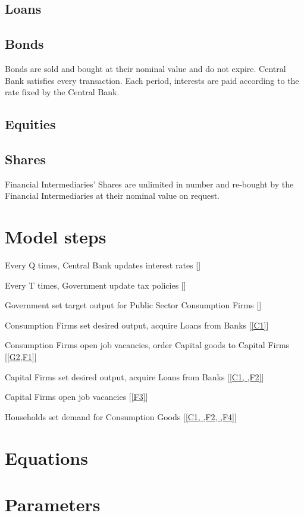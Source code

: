 \documentclass[a4paper, headings=standardclasses]{scrartcl}
\begin{document}
\subsection{Loans}

\subsection{Bonds}
Bonds are sold and bought at their nominal value and do not expire. Central Bank satisfies every transaction. Each period, interests are paid according to the rate fixed by the Central Bank.

\subsection{Equities}

\subsection{Shares}
Financial Intermediaries' Shares are unlimited in number and re-bought by the Financial Intermediaries at their nominal value on request.

\section{Model steps}
\begin{steps}
	\item \label{C1} Every Q times, Central Bank updates interest rates []
	\item \label{G1} Every T times, Government update tax policies []
	\item \label{G2} Government set target output for Public Sector Consumption Firms []
	\item \label{F1} Consumption Firms set desired output, acquire Loans from Banks [\cref{C1}]
	\item \label{F2} Consumption Firms open job vacancies, order Capital goods to Capital Firms [\cref{G2,F1}]
	\item \label{F3} Capital Firms set desired output, acquire Loans from Banks [\cref{C1, ,F2}]
	\item \label{F4} Capital Firms open job vacancies [\cref{F3}]
	\item \label{H1} Households set demand for Consumption Goods [\cref{C1, ,F2, ,F4}]
	
\end{steps}

\section{Equations}

\section{Parameters}
	
	\printbibliography
	
\end{document}
